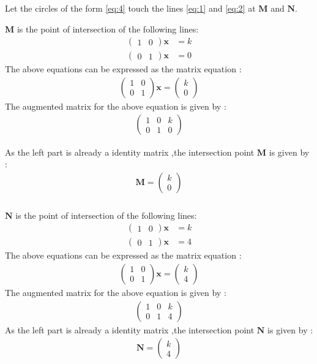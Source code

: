 \documentclass{beamer}
\newcommand{\myvec}[1]{\ensuremath{\begin{pmatrix}#1\end{pmatrix}}}
\renewcommand{\vec}[1]{\mathbf{#1}}
\begin{document}
\begin{frame}
Let the circles of the form \eqref{eq:4} touch the lines \eqref{eq:1} and \eqref{eq:2} at $\vec{M}$ and $\vec{N}$.

$\vec{M}$ is the point of intersection of the following lines:
\begin{align}
\myvec{1 & 0}\vec{x} &=k\\
\myvec{0 & 1}\vec{x} &=0
\end{align}
The above equations can be expressed as the matrix equation :
\begin{align}
\myvec{1 & 0 \\ 0 & 1}\vec{x} = \myvec{k \\ 0}
\end{align}
The augmented matrix for the above equation is given by :
\begin{align}
\myvec{1 & 0 & k\\ 0 & 1 & 0}
\end{align}

As the left part is already a identity matrix ,the intersection point $\vec{M}$ is given by :
\begin{align}
\vec{M} = \myvec{k \\ 0}
\end{align}
\end{frame}

\begin{frame}
\frametitle{}
$\vec{N}$ is the point of intersection of the following lines:
\begin{align}
\myvec{1 & 0}\vec{x} &=k\\
\myvec{0 & 1}\vec{x} &=4
\end{align}
The above equations can be expressed as the matrix equation :
\begin{align}
\myvec{1 & 0 \\ 0 & 1}\vec{x} = \myvec{k \\ 4}
\end{align}
The augmented matrix for the above equation is given by :
\begin{align}
\myvec{1 & 0 & k\\ 0 & 1 & 4}
\end{align}
As the left part is already a identity matrix ,the intersection point $\vec{N}$ is given by :
\begin{align}
\vec{N} = \myvec{k \\ 4}
\end{align}
\end{frame}
\end{document}
